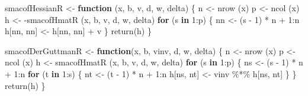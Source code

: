 \documentclass[
  12pt,
  letterpaper,
  DIV=11,
  numbers=noendperiod]{scrreprt}
\newenvironment{Shaded}{\begin{snugshade}}{\end{snugshade}}
\newcommand{\ControlFlowTok}[1]{\textcolor[rgb]{0.00,0.23,0.31}{\textbf{#1}}}
\newcommand{\DecValTok}[1]{\textcolor[rgb]{0.68,0.00,0.00}{#1}}
\newcommand{\FunctionTok}[1]{\textcolor[rgb]{0.28,0.35,0.67}{#1}}
\newcommand{\NormalTok}[1]{\textcolor[rgb]{0.00,0.23,0.31}{#1}}
\newcommand{\OtherTok}[1]{\textcolor[rgb]{0.00,0.23,0.31}{#1}}
\newcommand{\SpecialCharTok}[1]{\textcolor[rgb]{0.37,0.37,0.37}{#1}}
\theoremstyle{remark}
\begin{document}
\begin{Shaded}
\begin{Highlighting}[]
\NormalTok{smacofHessianR }\OtherTok{\textless{}{-}} \ControlFlowTok{function}\NormalTok{ (x, b, v, d, w, delta) \{}
\NormalTok{  n }\OtherTok{\textless{}{-}} \FunctionTok{nrow}\NormalTok{ (x)}
\NormalTok{  p }\OtherTok{\textless{}{-}} \FunctionTok{ncol}\NormalTok{ (x)}
\NormalTok{  h }\OtherTok{\textless{}{-}} \SpecialCharTok{{-}}\FunctionTok{smacofHmatR}\NormalTok{ (x, b, v, d, w, delta)}
  \ControlFlowTok{for}\NormalTok{ (s }\ControlFlowTok{in} \DecValTok{1}\SpecialCharTok{:}\NormalTok{p) \{}
\NormalTok{    nn }\OtherTok{\textless{}{-}}\NormalTok{ (s }\SpecialCharTok{{-}} \DecValTok{1}\NormalTok{) }\SpecialCharTok{*}\NormalTok{ n }\SpecialCharTok{+} \DecValTok{1}\SpecialCharTok{:}\NormalTok{n}
\NormalTok{    h[nn, nn] }\OtherTok{\textless{}{-}}\NormalTok{ h[nn, nn] }\SpecialCharTok{+}\NormalTok{ v}
\NormalTok{  \}}
  \FunctionTok{return}\NormalTok{(h)}
\NormalTok{\}}

\NormalTok{smacofDerGuttmanR }\OtherTok{\textless{}{-}} \ControlFlowTok{function}\NormalTok{(x, b, vinv, d, w, delta) \{}
\NormalTok{  n }\OtherTok{\textless{}{-}} \FunctionTok{nrow}\NormalTok{ (x)}
\NormalTok{  p }\OtherTok{\textless{}{-}} \FunctionTok{ncol}\NormalTok{ (x)}
\NormalTok{  h }\OtherTok{\textless{}{-}} \FunctionTok{smacofHmatR}\NormalTok{ (x, b, v, d, w, delta)}
  \ControlFlowTok{for}\NormalTok{ (s }\ControlFlowTok{in} \DecValTok{1}\SpecialCharTok{:}\NormalTok{p) \{}
\NormalTok{    ns }\OtherTok{\textless{}{-}}\NormalTok{ (s }\SpecialCharTok{{-}} \DecValTok{1}\NormalTok{) }\SpecialCharTok{*}\NormalTok{ n }\SpecialCharTok{+} \DecValTok{1}\SpecialCharTok{:}\NormalTok{n}
    \ControlFlowTok{for}\NormalTok{ (t }\ControlFlowTok{in} \DecValTok{1}\SpecialCharTok{:}\NormalTok{s) \{}
\NormalTok{      nt }\OtherTok{\textless{}{-}}\NormalTok{ (t }\SpecialCharTok{{-}} \DecValTok{1}\NormalTok{) }\SpecialCharTok{*}\NormalTok{ n }\SpecialCharTok{+} \DecValTok{1}\SpecialCharTok{:}\NormalTok{n}
\NormalTok{      h[ns, nt] }\OtherTok{\textless{}{-}}\NormalTok{ vinv }\SpecialCharTok{\%*\%}\NormalTok{ h[ns, nt]}
\NormalTok{    \}}
\NormalTok{  \}}
  \FunctionTok{return}\NormalTok{(h)}
\NormalTok{\}}


\end{Highlighting}
\end{Shaded}
\end{document}
